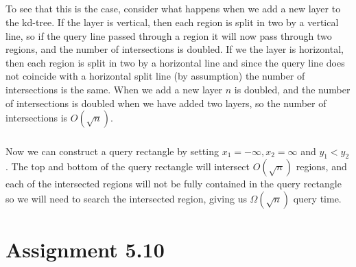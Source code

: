 \documentclass[10pt,a4paper,final,oneside,openany,article]{memoir}
\begin{document}
\paragraph{}
To see that this is the case, consider what happens when we add a new layer to the kd-tree. If the layer is vertical, then each region is split in two by a vertical line, so if the query line passed through a region it will now pass through two regions, and the number of intersections is doubled. If we the layer is horizontal, then each region is split in two by a horizontal line and since the query line does not coincide with a horizontal split line (by assumption) the number of intersections is the same. When we add a new layer $n$ is doubled, and the number of intersections is doubled when we have added two layers, so the number of intersections is $O(\sqrt{n})$.

\paragraph{}
Now we can construct a query rectangle by setting $x_1 = -\infty, x_2 = \infty$ and $y_1 < y_2$. The top and bottom of the query rectangle will intersect $O(\sqrt{n})$ regions, and each of the intersected regions will not be fully contained in the query rectangle so we will need to search the intersected region, giving us $\Omega(\sqrt{n})$ query time.



\chapter*{Assignment 5.10}
\end{document}
